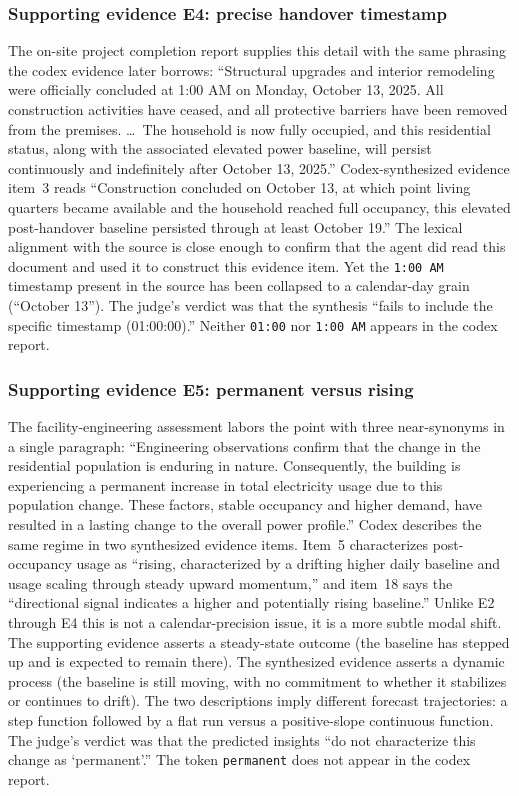 \documentclass[]{servicenow}
\begin{document}
\subsubsection*{Supporting evidence E4: precise handover timestamp}

The on-site project completion report supplies this detail with the same phrasing the codex evidence later borrows: ``Structural upgrades and interior remodeling were officially concluded at 1:00 AM on Monday, October 13, 2025. All construction activities have ceased, and all protective barriers have been removed from the premises. \dots\ The household is now fully occupied, and this residential status, along with the associated elevated power baseline, will persist continuously and indefinitely after October 13, 2025.'' Codex-synthesized evidence item~3 reads ``Construction concluded on October 13, at which point living quarters became available and the household reached full occupancy, this elevated post-handover baseline persisted through at least October 19.'' The lexical alignment with the source is close enough to confirm that the agent did read this document and used it to construct this evidence item. Yet the \texttt{1:00 AM} timestamp present in the source has been collapsed to a calendar-day grain (``October 13''). The judge's verdict was that the synthesis ``fails to include the specific timestamp (01:00:00).'' Neither \texttt{01:00} nor \texttt{1:00 AM} appears in the codex report.

\subsubsection*{Supporting evidence E5: permanent versus rising}

The facility-engineering assessment labors the point with three near-synonyms in a single paragraph: ``Engineering observations confirm that the change in the residential population is enduring in nature. Consequently, the building is experiencing a permanent increase in total electricity usage due to this population change. These factors, stable occupancy and higher demand, have resulted in a lasting change to the overall power profile.'' Codex describes the same regime in two synthesized evidence items. Item~5 characterizes post-occupancy usage as ``rising, characterized by a drifting higher daily baseline and usage scaling through steady upward momentum,'' and item~18 says the ``directional signal indicates a higher and potentially rising baseline.'' Unlike E2 through E4 this is not a calendar-precision issue, it is a more subtle modal shift. The supporting evidence asserts a steady-state outcome (the baseline has stepped up and is expected to remain there). The synthesized evidence asserts a dynamic process (the baseline is still moving, with no commitment to whether it stabilizes or continues to drift). The two descriptions imply different forecast trajectories: a step function followed by a flat run versus a positive-slope continuous function. The judge's verdict was that the predicted insights ``do not characterize this change as `permanent'.'' The token \texttt{permanent} does not appear in the codex report.
\end{document}
